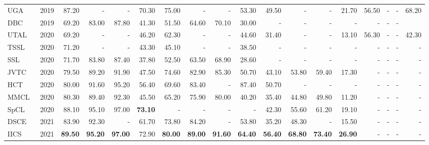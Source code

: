 \documentclass[a4paper,fleqn]{cas-dc}
\begin{document}
\begin{table} [t]
{\begin{tabular}{l|l|rrrr|rrrr|rrrr|rrrr}
UGA~\cite{wu_unsupervised_2019-1}&2019&87.20&-&-&70.30&75.00&-&-&53.30&49.50&-&-&21.70&56.50&-&-&68.20\\
DBC~\cite{ding_towards_2019}&2019&69.20&83.00&87.80&41.30&51.50&64.60&70.10&30.00&-&-&-&-&-&-&-&\\
UTAL~\cite{li_unsupervised_2020}&2020&69.20&-&-&46.20&62.30&-&-&44.60&31.40&-&-&13.10&56.30&-&-&42.30\\
TSSL~\cite{wu_tracklet_2020}&2020&71.20&-&-&43.30&45.10&-&-&38.50&-&-&-&-&-&-&-&-\\
SSL~\cite{lin_unsupervised_2020}&2020&71.70&83.80&87.40&37.80&52.50&63.50&68.90&28.60&-&-&-&-&-&-&-&-\\
JVTC~\cite{vedaldi_joint_2020-1}&2020&79.50&89.20&91.90&47.50&74.60&82.90&85.30&50.70&43.10&53.80&59.40&17.30&-&-&-&-\\
HCT~\cite{zeng_hierarchical_2020}&2020&80.00&91.60&95.20&56.40&69.60&83.40&-&87.40&50.70&-&-&-&-&-&-&-\\
MMCL~\cite{wang_unsupervised_2020}&2020&80.30&89.40&92.30&45.50&65.20&75.90&80.00&40.20&35.40&44.80&49.80&11.20&-&-&-&-\\
SpCL~\cite{ge_self-paced_2020}&2020&88.10&95.10&97.00&{\bf 73.10}&-&-&-&-&42.30&55.60&61.20&19.10&-&-&-&-\\
DSCE~\cite{yang_joint_2021}&2021&83.90&92.30&-&61.70&73.80&84.20&-&53.80&35.20&48.30&-&15.50&-&-&-&-\\
IICS~\cite{xuan_intra-inter_2021}&2021&{\bf 89.50}&{\bf 95.20}&{\bf 97.00}&72.90&{\bf 80.00}&{\bf 89.00}&{\bf 91.60}&{\bf 64.40}&{\bf 56.40}&{\bf 68.80}&{\bf 73.40}&{\bf 26.90}&-&-&-&-\\
\bottomrule
\end{tabular}
}
\end{table}
\end{document}
